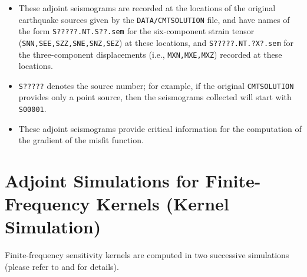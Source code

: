 \documentclass[oneside,english]{book}
\begin{document}
\begin{enumerate}
\begin{itemize}
\item These adjoint seismograms are recorded at the locations of the original
earthquake sources given by the \texttt{DATA/CMTSOLUTION} file, and
have names of the form \texttt{S?????.NT.S??.sem} for the six-component
strain tensor (\texttt{SNN,SEE,SZZ,SNE,SNZ,SEZ}) at these locations,
and \texttt{S?????.NT.?X?.sem} for the three-component displacements
(i.e., \texttt{MXN,MXE,MXZ}) recorded at these locations.
\item \texttt{S?????} denotes the source number; for example, if the original
\texttt{CMTSOLUTION} provides only a point source, then the seismograms
collected will start with \texttt{S00001}.
\item These adjoint seismograms provide critical information for the computation
of the gradient of the misfit function.
\end{itemize}
\end{enumerate}

\section{\label{sec:Adjoint-simulation-finite}Adjoint Simulations for Finite-Frequency
Kernels (Kernel Simulation)}

Finite-frequency sensitivity kernels are computed in two successive
simulations (please refer to \citet{LiTr06} and \citet{TrKoLi08} for details).
\end{document}
